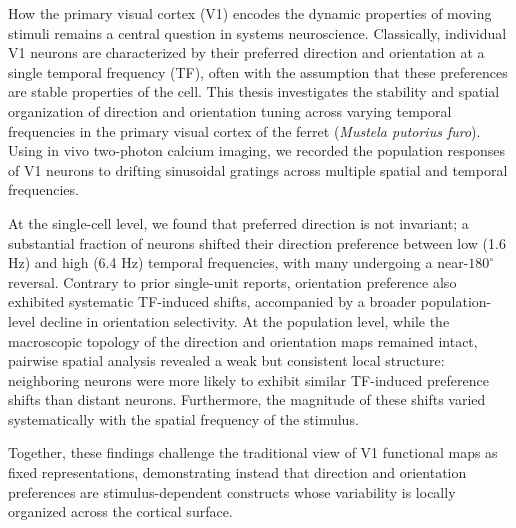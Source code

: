 \documentclass{brandeis-thesis3.3}
\begin{document}
\begin{thesis-abstract}
How the primary visual cortex (V1) encodes the dynamic properties of moving stimuli remains a central question in systems neuroscience. Classically, individual V1 neurons are characterized by their preferred direction and orientation at a single temporal frequency (TF), often with the assumption that these preferences are stable properties of the cell. This thesis investigates the stability and spatial organization of direction and orientation tuning across varying temporal frequencies in the primary visual cortex of the ferret (\textit{Mustela putorius furo}). Using in vivo two-photon calcium imaging, we recorded the population responses of V1 neurons to drifting sinusoidal gratings across multiple spatial and temporal frequencies. 

At the single-cell level, we found that preferred direction is not invariant; a substantial fraction of neurons shifted their direction preference between low (1.6 Hz) and high (6.4 Hz) temporal frequencies, with many undergoing a near-$180^{\circ}$ reversal. Contrary to prior single-unit reports, orientation preference also exhibited systematic TF-induced shifts, accompanied by a broader population-level decline in orientation selectivity. At the population level, while the macroscopic topology of the direction and orientation maps remained intact, pairwise spatial analysis revealed a weak but consistent local structure: neighboring neurons were more likely to exhibit similar TF-induced preference shifts than distant neurons. Furthermore, the magnitude of these shifts varied systematically with the spatial frequency of the stimulus. 

Together, these findings challenge the traditional view of V1 functional maps as fixed representations, demonstrating instead that direction and orientation preferences are stimulus-dependent constructs whose variability is locally organized across the cortical surface.

\end{thesis-abstract}


\doublespacing

\tableofcontents
\clearpage

\listoffigures
{}
\clearpage

\startbody
\end{document}
